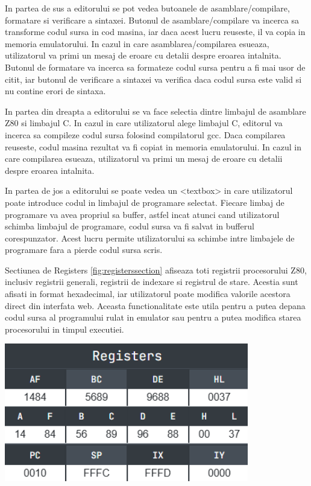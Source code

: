 \documentclass[titlepage,12pt]{article}
\DeclareRobustCommand{\code}[1]{{\ttfamily\small #1}}
\begin{document}
In partea de sus a editorului se pot vedea butoanele de asamblare/compilare, formatare si verificare a sintaxei. Butonul de asamblare/compilare va incerca sa transforme codul sursa in cod masina, iar daca acest lucru reuseste, il va copia in memoria emulatorului. In cazul in care asamblarea/compilarea esueaza, utilizatorul va primi un mesaj de eroare cu detalii despre eroarea intalnita. Butonul de formatare va incerca sa formateze codul sursa pentru a fi mai usor de citit, iar butonul de verificare a sintaxei va verifica daca codul sursa este valid si nu contine erori de sintaxa.

In partea din dreapta a editorului se va face selectia dintre limbajul de asamblare Z80 si limbajul C. In cazul in care utilizatorul alege limbajul C, editorul va incerca sa compileze codul sursa folosind compilatorul \code{gcc}. Daca compilarea reuseste, codul masina rezultat va fi copiat in memoria emulatorului. In cazul in care compilarea esueaza, utilizatorul va primi un mesaj de eroare cu detalii despre eroarea intalnita.

In partea de jos a editorului se poate vedea un \code{<textbox>} in care utilizatorul poate introduce codul in limbajul de programare selectat. Fiecare limbaj de programare va avea propriul sa buffer, astfel incat atunci cand utilizatorul schimba limbajul de programare, codul sursa va fi salvat in bufferul corespunzator. Acest lucru permite utilizatorului sa schimbe intre limbajele de programare fara a pierde codul sursa scris.

\begin{minipage}[c]{0.55\textwidth} %
Sectiunea de \code{Registers} \cref{fig:registerssection} afiseaza toti registrii procesorului Z80, inclusiv registrii generali, registrii de indexare si registrul de stare. Acestia sunt afisati in format hexadecimal, iar utilizatorul poate modifica valorile acestora direct din interfata web. Aceasta functionalitate este utila pentru a putea depana codul sursa al programului rulat in emulator sau pentru a putea modifica starea procesorului in timpul executiei.
\end{minipage}%
\hfill
\begin{minipage}[c]{0.4\textwidth} %
\centering
\includegraphics[width=0.8\textwidth]{images/registerssection.png}
\label{fig:registerssection}
\end{minipage}
\end{document}
